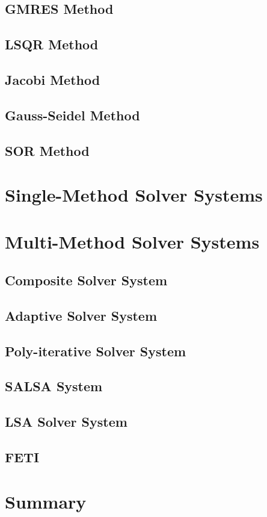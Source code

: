 \subsection{GMRES Method}
\subsection{LSQR Method}
\subsection{Jacobi Method}
\subsection{Gauss-Seidel Method}
\subsection{SOR Method}


\section{Single-Method Solver Systems}

\section{Multi-Method Solver Systems}
\subsection{Composite Solver System}
\subsection{Adaptive Solver System}
\subsection{Poly-iterative Solver System}
\subsection{SALSA System}
\subsection{LSA Solver System}
\subsection{FETI}


\section{Summary}